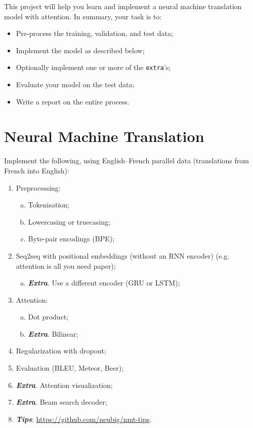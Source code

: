 
This project will help you learn and implement a neural machine translation model with attention.
In summary, your task is to:

\begin{itemize}
	\item Pre-process the training, validation, and test data;
	\item Implement the model as described below;
	\item Optionally implement one or more of the \texttt{extra}'s;
	\item Evaluate your model on the test data;
	\item Write a report on the entire process.
\end{itemize}

\section{Neural Machine Translation}

Implement the following, using English--French parallel data (translations from French into English):

\begin{enumerate}
	\item Preprocessing:
	\begin{enumerate}[a)]
		\item Tokenisation;
		\item Lowercasing or truecasing;
		\item Byte-pair encodings (BPE);
	\end{enumerate}
	\item Seq2seq with positional embeddings (without an RNN encoder) (e.g. attention is all you need paper);
	\begin{enumerate}[a)]
		\item \textbf{\textit{Extra}}. Use a different encoder (GRU or LSTM);
	\end{enumerate}
	\item Attention:
	\begin{enumerate}[a)]
		\item Dot product;
		\item \textbf{\textit{Extra}}. Bilinear;
	\end{enumerate}
	\item Regularization with dropout;
	\item Evaluation (BLEU, Meteor, Beer);
	\item \textbf{\textit{Extra}}. Attention visualization;
	\item \textbf{\textit{Extra}}. Beam search decoder;
	\item \textbf{\textit{Tips}}: \url{https://github.com/neubig/nmt-tips}.
\end{enumerate}

